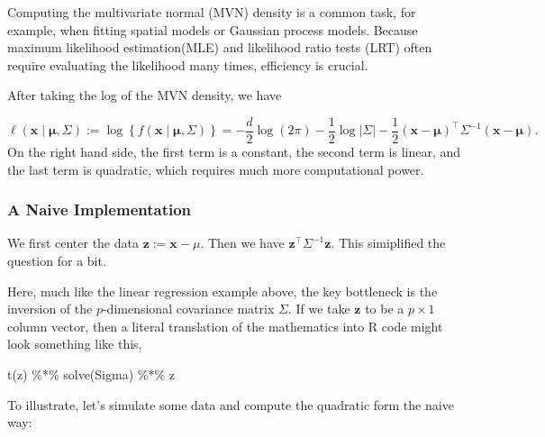 \documentclass[
  letterpaper,
  DIV=11,
  numbers=noendperiod]{scrreprt}
\newenvironment{Shaded}{\begin{snugshade}}{\end{snugshade}}
\newcommand{\FunctionTok}[1]{\textcolor[rgb]{0.28,0.35,0.67}{#1}}
\newcommand{\NormalTok}[1]{\textcolor[rgb]{0.00,0.23,0.31}{#1}}
\newcommand{\SpecialCharTok}[1]{\textcolor[rgb]{0.37,0.37,0.37}{#1}}
\begin{document}
Computing the multivariate normal (MVN) density is a common task, for
example, when fitting spatial models or Gaussian process models. Because
maximum likelihood estimation(MLE) and likelihood ratio tests (LRT)
often require evaluating the likelihood many times, efficiency is
crucial.

After taking the log of the MVN density, we have

\[
\ell(\boldsymbol{x}\mid \boldsymbol{\mu},\Sigma) := \log \left\{ f(\boldsymbol{x}\mid \boldsymbol{\mu},\Sigma) \right\} 
= -\frac{d}{2}\log(2\pi) - \frac{1}{2}\log|\Sigma| - \frac{1}{2}(\boldsymbol{x}-\boldsymbol{\mu})^\top \Sigma^{-1}(\boldsymbol{x}-\boldsymbol{\mu}).
\] On the right hand side, the first term is a constant, the second term
is linear, and the last term is quadratic, which requires much more
computational power.

\subsubsection{A Naive Implementation}\label{a-naive-implementation}

We first center the data \(\boldsymbol{z}:=\boldsymbol{x}- \mu\). Then
we have \(\boldsymbol{z}^\top \Sigma^{-1} \boldsymbol{z}\). This
simiplified the question for a bit.

Here, much like the linear regression example above, the key bottleneck
is the inversion of the \(p\)-dimensional covariance matrix \(\Sigma\).
If we take \(\boldsymbol{z}\) to be a \(p\times 1\) column vector, then
a literal translation of the mathematics into R code might look
something like this,

\begin{Shaded}
\begin{Highlighting}[]
\FunctionTok{t}\NormalTok{(z) }\SpecialCharTok{\%*\%} \FunctionTok{solve}\NormalTok{(Sigma) }\SpecialCharTok{\%*\%}\NormalTok{ z}
\end{Highlighting}
\end{Shaded}

To illustrate, let's simulate some data and compute the quadratic form
the naive way:
\end{document}
